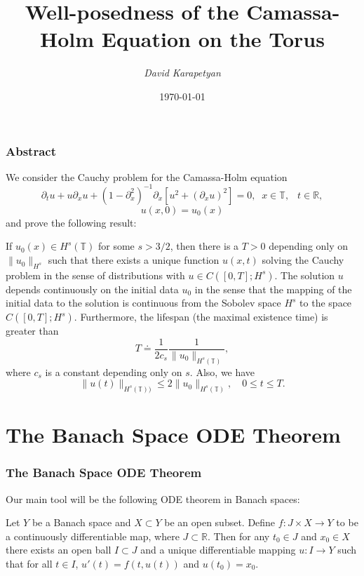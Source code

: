 \documentclass{beamer}
\date{\today}
\title{Well-posedness of the Camassa-Holm Equation on the Torus}
\author{\it David Karapetyan}
\newcommand{\rr}{\mathbb{R}}
\newcommand{\p}{\partial}
\newcommand{\ci}{\mathbb{T}}
\begin{document}
 \begin{frame}
	 \titlepage
 \end{frame}
 
 \begin{frame}
	 \frametitle{Abstract}
	 We consider the Cauchy problem for the Camassa-Holm equation
	 \begin{equation*} 
		 \label{hr}
		 \partial_t u + u\partial_x u + (1-\p_x^2)^{-1} \p_x \left
		 [u^2 + (\p_x u)^2 \right ] = 0,
		 \,\,
		 \ x \in  \mathbb{T},  \;\;  \ t \in \mathbb{R},
	 \end{equation*}
	 \begin{equation*} 
		 \label{hr-data} 
		 u(x, 0) = u_0 (x)
	 \end{equation*}
%
and prove the following result:
\end{frame}

\begin{frame}
%
%
%
\begin{theorem}
	\vskip0.1in
\label{hr-wp}
If $u_0(x) \in  H^s(\ci)$ for some $s >3/2$,  then there is  a $T>0$
depending only on  $\|u_0\|_{H^s}$ such that there exists a unique
function $u(x, t)$ solving  the Cauchy problem
in the sense of distributions with  $u \in C([0, T]; H^s)$.
The solution $u$ depends continuously  on the initial data $u_0$
in the sense that the mapping of the initial data to the solution 
is continuous from the Sobolev space $H^s$ to the space $C([0, T]; H^s)$.
Furthermore, the  lifespan (the maximal existence time)
 is greater than 
%
     \begin{equation*}
   T
   \doteq
   \frac{1}{2c_s}
   \frac{1}{ \|u_0 \|_{H^s(\ci)}},
 \end{equation*}
%
where $c_s$  is a constant depending only on $s$.
Also, we have 
%
  \begin{equation*}
   \label{u-u0-Hs-bound}
\|u(t)\|_{H^s(\ci))}
  \le
  2
  \|u_0 \|_{H^s(\ci)},
  \quad
  0\le t \le T.
   \end{equation*}
\end{theorem}
\end{frame}

\section{The Banach Space ODE Theorem  } 
 \setcounter{equation}{0}

 \begin{frame}
	 \frametitle{The Banach Space ODE Theorem}
%
Our main tool will be the following ODE theorem in Banach spaces:
%
\vskip0.1in
\begin{theorem}
	\label{ode_theorem}
	Let  $Y$  be a Banach space and $X\subset Y$ be an open subset.
	Define $f: J \times X\to Y$ to be a continuously differentiable
	map, where $J \subset \rr$.  Then for any $t_{0}
	\in J$ and $x_{0} \in X$ there exists an
	open ball $I \subset J$ and a unique differentiable mapping $u:I
   \to Y$ such that for all $t \in I$,  $u'(t) = f(t, u(t))$
	and $u(t_{0}) = x_{0}.$
\end{theorem}
\end{frame}
\end{document}
